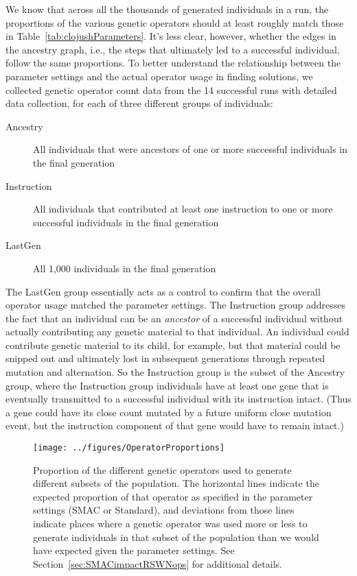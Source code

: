 We know that across all the thousands of generated individuals in a run,
the proportions of the various genetic operators should at least roughly
match those in Table~\ref{tab:clojushParameters}. It's less clear, however,
whether the edges in the ancestry graph, i.e., the steps that ultimately led
to a successful individual, follow the same proportions. To better understand
the relationship between the parameter settings and the actual operator usage
in finding solutions, we collected genetic operator count data from the 14 successful
runs with detailed data collection, for each of three different 
groups of individuals:
\begin{description}
	\item[Ancestry] All individuals that were ancestors of one or more successful
	individuals in the final generation
	\item[Instruction] All individuals that contributed at least one instruction to
	one or more successful individuals in the final generation
	\item[LastGen] All 1,000 individuals in the final generation
\end{description}
The LastGen group essentially acts as a control to confirm that 
the overall operator usage matched the parameter settings. The Instruction group
addresses the fact that an individual can be an \emph{ancestor} of a
successful individual without actually contributing any genetic material
to that individual. An individual could contribute genetic material to its
child, for example, but that material could be snipped out and 
ultimately lost in subsequent
generations through repeated mutation and alternation. So the Instruction
group is the subset of the Ancestry group, where the Instruction group 
individuals have
at least one gene that is eventually transmitted to a successful individual
with its instruction intact. (Thus a gene could have its close count mutated
by a future uniform close mutation event, but the instruction component of
that gene would have to remain intact.)

\begin{figure*}
	\texttt{[image: ../figures/OperatorProportions]}
	\caption{Proportion of the different genetic operators used to
	generate different subsets of the population. The horizontal lines 
	indicate the expected proportion of that operator as specified in 
	the parameter settings (SMAC or Standard), and deviations from those
	lines indicate places where a genetic operator was used more or less
	to generate individuals in that subset of the population 
	than we would have expected given the parameter settings. See 
	Section~\ref{sec:SMACimpactRSWNops} for additional details.}
	\label{fig:opProportions}
\end{figure*}

